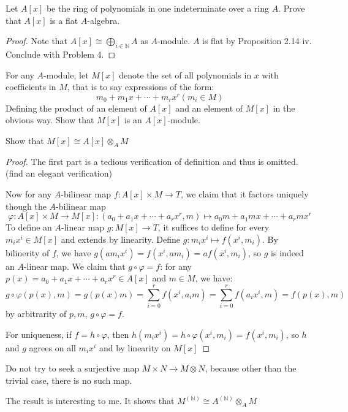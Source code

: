 \documentclass{solution}
\begin{document}
\begin{problem}
    Let $A[x]$ be the ring of polynomials in one indeterminate over a ring $A$. Prove that $A[x]$ is a flat $A$-algebra.
\end{problem}

\begin{proof}
    Note that $A[x] \cong \bigoplus_{i \in \mathbb{N}} A$ as $A$-module. $A$ is flat by Proposition 2.14 iv. Conclude with Problem 4.
\end{proof}

\begin{problem}
    For any $A$-module, let $M[x]$ denote the set of all polynomials in $x$ with coefficients in $M$, that is to say expressions of the form:
    $$m_0 + m_1x + \cdots + m_rx^r(m_i \in M)$$
    Defining the product of an element of $A[x]$ and an element of $M[x]$ in the obvious way. Show that $M[x]$ is an $A[x]$-module.

    Show that $M[x] \cong A[x] \otimes_A M$
\end{problem}

\begin{proof}
    The first part is a tedious verification of definition and thus is omitted. (\TODO find an elegant verification)

    Now for any $A$-bilinear map $f: A[x] \times M \rightarrow T$, we claim that it factors uniquely though the $A$-bilinear map
    $$\varphi: A[x] \times M \rightarrow M[x]: (a_0 + a_1x + \cdots + a_rx^r, m) \mapsto a_0m + a_1mx+ \cdots + a_rmx^r$$
    To define an $A$-linear map $g: M[x] \rightarrow T$, it suffices to define for every $m_ix^i \in M[x]$ and extends by linearity. Define $g: m_ix^i \mapsto f(x^i, m_i)$. By bilinerity of $f$, we have $g(am_i x^i) = f(x^i, am_i) = a f(x^i, m_i)$, so $g$ is indeed an $A$-linear map. We claim that $g \circ \varphi = f$: for any $p(x) = a_0 + a_1x + \cdots + a_rx^r \in A[x]$ and $m \in M$, we have:
    $$g \circ \varphi(p(x), m) = g (p(x)m) = \sum\limits_{i = 0}^{r} f(x^i, a_im) = \sum\limits_{i = 0}^{r} f(a_ix^i, m) = f(p(x), m)$$
    by arbitrarity of $p, m$, $g \circ \varphi = f$.

    For uniqueness, if $f = h \circ \varphi$, then $h (m_ix^i) = h \circ \varphi(x^i, m_i) = f(x^i, m_i)$, so $h$ and $g$ agrees on all $m_ix^i$ and by linearity on $M[x]$
\end{proof}

\begin{remark}
    Do not try to seek a surjective map $M \times N \rightarrow M \otimes N$, because other than the trivial case, there is no such map.

    The result is interesting to me. It shows that $M^{(\mathbb{N})} \cong A^{(\mathbb{N})} \otimes_A M$
\end{remark}
\end{document}
